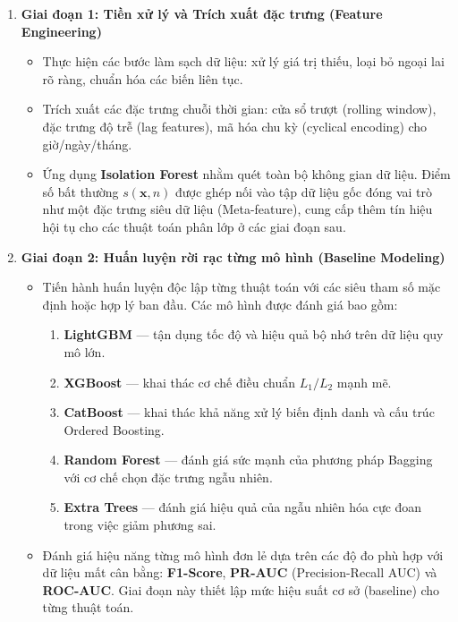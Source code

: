 \begin{enumerate}
    \item \textbf{Giai đoạn 1: Tiền xử lý và Trích xuất đặc trưng (Feature Engineering)}
    \begin{itemize}
        \item Thực hiện các bước làm sạch dữ liệu: xử lý giá trị thiếu, loại bỏ ngoại lai rõ ràng, chuẩn hóa các biến liên tục.
        \item Trích xuất các đặc trưng chuỗi thời gian: cửa sổ trượt (rolling window), đặc trưng độ trễ (lag features), mã hóa chu kỳ (cyclical encoding) cho giờ/ngày/tháng.
        \item Ứng dụng \textbf{Isolation Forest} nhằm quét toàn bộ không gian dữ liệu. Điểm số bất thường $s(\mathbf{x}, n)$ được ghép nối vào tập dữ liệu gốc đóng vai trò như một đặc trưng siêu dữ liệu (Meta-feature), cung cấp thêm tín hiệu hội tụ cho các thuật toán phân lớp ở các giai đoạn sau.
    \end{itemize}
    
    \item \textbf{Giai đoạn 2: Huấn luyện rời rạc từng mô hình (Baseline Modeling)}
    \begin{itemize}
        \item Tiến hành huấn luyện độc lập từng thuật toán với các siêu tham số mặc định hoặc hợp lý ban đầu. Các mô hình được đánh giá bao gồm:
        \begin{enumerate}
            \item \textbf{LightGBM} — tận dụng tốc độ và hiệu quả bộ nhớ trên dữ liệu quy mô lớn.
            \item \textbf{XGBoost} — khai thác cơ chế điều chuẩn $L_1/L_2$ mạnh mẽ.
            \item \textbf{CatBoost} — khai thác khả năng xử lý biến định danh và cấu trúc Ordered Boosting.
            \item \textbf{Random Forest} — đánh giá sức mạnh của phương pháp Bagging với cơ chế chọn đặc trưng ngẫu nhiên.
            \item \textbf{Extra Trees} — đánh giá hiệu quả của ngẫu nhiên hóa cực đoan trong việc giảm phương sai.
        \end{enumerate}
        \item Đánh giá hiệu năng từng mô hình đơn lẻ dựa trên các độ đo phù hợp với dữ liệu mất cân bằng: \textbf{F1-Score}, \textbf{PR-AUC} (Precision-Recall AUC) và \textbf{ROC-AUC}. Giai đoạn này thiết lập mức hiệu suất cơ sở (baseline) cho từng thuật toán.
    \end{itemize}


\end{enumerate}
